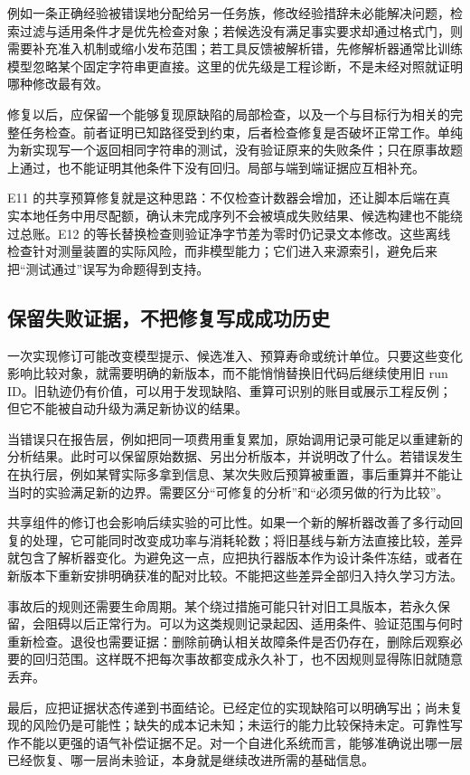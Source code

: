例如一条正确经验被错误地分配给另一任务族，修改经验措辞未必能解决问题，检索过滤与适用条件才是优先检查对象；若候选没有满足事实要求却通过格式门，则需要补充准入机制或缩小发布范围；若工具反馈被解析错，先修解析器通常比训练模型忽略某个固定字符串更直接。这里的优先级是工程诊断，不是未经对照就证明哪种修改最有效。

修复以后，应保留一个能够复现原缺陷的局部检查，以及一个与目标行为相关的完整任务检查。前者证明已知路径受到约束，后者检查修复是否破坏正常工作。单纯为新实现写一个返回相同字符串的测试，没有验证原来的失败条件；只在原事故题上通过，也不能证明其他条件下没有回归。局部与端到端证据应互相补充。

E11 的共享预算修复就是这种思路：不仅检查计数器会增加，还让脚本后端在真实本地任务中用尽配额，确认未完成序列不会被填成失败结果、候选构建也不能绕过总账。E12 的等长替换检查则验证净字节差为零时仍记录文本修改。这些离线检查针对测量装置的实际风险，而非模型能力；它们进入来源索引，避免后来把“测试通过”误写为命题得到支持。

\subsection{保留失败证据，不把修复写成成功历史}

一次实现修订可能改变模型提示、候选准入、预算寿命或统计单位。只要这些变化影响比较对象，就需要明确的新版本，而不能悄悄替换旧代码后继续使用旧 run ID。旧轨迹仍有价值，可以用于发现缺陷、重算可识别的账目或展示工程反例；但它不能被自动升级为满足新协议的结果。

当错误只在报告层，例如把同一项费用重复累加，原始调用记录可能足以重建新的分析结果。此时可以保留原始数据、另出分析版本，并说明改了什么。若错误发生在执行层，例如某臂实际多拿到信息、某次失败后预算被重置，事后重算并不能让当时的实验满足新的边界。需要区分“可修复的分析”和“必须另做的行为比较”。

共享组件的修订也会影响后续实验的可比性。如果一个新的解析器改善了多行动回复的处理，它可能同时改变成功率与消耗轮数；将旧基线与新方法直接比较，差异就包含了解析器变化。为避免这一点，应把执行器版本作为设计条件冻结，或者在新版本下重新安排明确获准的配对比较。不能把这些差异全部归入持久学习方法。

事故后的规则还需要生命周期。某个绕过措施可能只针对旧工具版本，若永久保留，会阻碍以后正常行为。可以为这类规则记录起因、适用条件、验证范围与何时重新检查。退役也需要证据：删除前确认相关故障条件是否仍存在，删除后观察必要的回归范围。这样既不把每次事故都变成永久补丁，也不因规则显得陈旧就随意丢弃。

最后，应把证据状态传递到书面结论。已经定位的实现缺陷可以明确写出；尚未复现的风险仍是可能性；缺失的成本记未知；未运行的能力比较保持未定。可靠性写作不能以更强的语气补偿证据不足。对一个自进化系统而言，能够准确说出哪一层已经恢复、哪一层尚未验证，本身就是继续改进所需的基础信息。

